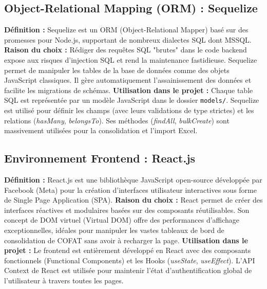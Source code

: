 \subsection{Object-Relational Mapping (ORM) : Sequelize}
\textbf{Définition :} Sequelize est un ORM (Object-Relational Mapper) basé sur des promesses pour Node.js, supportant de nombreux dialectes SQL dont MSSQL.
\newline
\textbf{Raison du choix :} Rédiger des requêtes SQL "brutes" dans le code backend expose aux risques d'injection SQL et rend la maintenance fastidieuse. Sequelize permet de manipuler les tables de la base de données comme des objets JavaScript classiques. Il gère automatiquement l'assainissement des données et facilite les migrations de schémas.
\newline
\textbf{Utilisation dans le projet :} Chaque table SQL est représentée par un modèle JavaScript dans le dossier \texttt{models/}. Sequelize est utilisé pour définir les champs (avec leurs validations de type strictes) et les relations (\textit{hasMany}, \textit{belongsTo}). Ses méthodes (\textit{findAll}, \textit{bulkCreate}) sont massivement utilisées pour la consolidation et l'import Excel.

\subsection{Environnement Frontend : React.js}
\textbf{Définition :} React.js est une bibliothèque JavaScript open-source développée par Facebook (Meta) pour la création d'interfaces utilisateur interactives sous forme de Single Page Application (SPA).
\newline
\textbf{Raison du choix :} React permet de créer des interfaces réactives et modulaires basées sur des composants réutilisables. Son concept de DOM virtuel (Virtual DOM) offre des performances d'affichage exceptionnelles, idéales pour manipuler les vastes tableaux de bord de consolidation de COFAT sans avoir à recharger la page.
\newline
\textbf{Utilisation dans le projet :} Le frontend est entièrement développé en React avec des composants fonctionnels (Functional Components) et les Hooks (\textit{useState}, \textit{useEffect}). L'API Context de React est utilisée pour maintenir l'état d'authentification global de l'utilisateur à travers toutes les pages.


